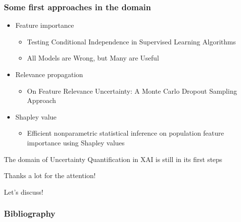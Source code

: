 \begin{frame}
  \frametitle{Some first approaches in the domain}
  \begin{itemize}
  \item Feature importance
    \begin{itemize}
      \item Testing Conditional Independence in Supervised Learning Algorithms\cite{watson2021testing}
      \item All Models are Wrong, but Many are Useful\cite{JMLR:v20:18-760}
      \end{itemize}
    \item Relevance propagation
      \begin{itemize}
      \item On Feature Relevance Uncertainty: A Monte Carlo Dropout Sampling Approach~\cite{fabi2020}
      \end{itemize}
    \item Shapley value
      \begin{itemize}
      \item Efficient nonparametric statistical inference on
        population feature importance using Shapley
        values\cite{williamson2020efficient}
      \end{itemize}
    \end{itemize}
  \noindent\makebox[\linewidth]{\rule{\paperwidth}{0.4pt}}
  The domain of Uncertainty Quantification in XAI is still in its first steps
\end{frame}

\begin{frame}
  Thanks a lot for the attention!

  Let's discuss!
\end{frame}

\begin{frame}[allowframebreaks]
  \frametitle{Bibliography}
  \printbibliography
\end{frame}
